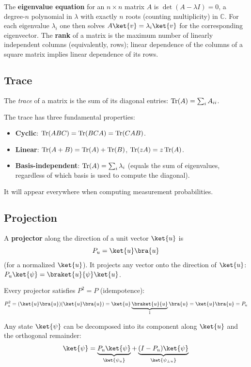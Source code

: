 \documentclass[oneside]{academica}
\begin{document}
The \textbf{eigenvalue equation} for an $n\times n$ matrix $A$ is $\det(A-\lambda I)=0$, a degree-$n$ polynomial in $\lambda$ with exactly $n$ roots (counting multiplicity) in $\mathbb{C}$.
For each eigenvalue $\lambda_i$ one then solves $A\ket{v}=\lambda_i\ket{v}$ for the corresponding eigenvector.
The \textbf{rank} of a matrix is the maximum number of linearly independent columns (equivalently, rows); linear dependence of the columns of a square matrix implies linear dependence of its rows.

\subsection{Trace}

\begin{definition*}[Trace]
  The \emph{trace} of a matrix is the sum of its diagonal entries:
  $\operatorname{Tr}(A)=\sum_i A_{ii}$.
\end{definition*}

The trace has three fundamental properties:
\begin{itemize}
  \item \textbf{Cyclic}: $\operatorname{Tr}(ABC)=\operatorname{Tr}(BCA)=\operatorname{Tr}(CAB)$.
  \item \textbf{Linear}: $\operatorname{Tr}(A+B)=\operatorname{Tr}(A)+\operatorname{Tr}(B)$, $\operatorname{Tr}(zA)=z\operatorname{Tr}(A)$.
  \item \textbf{Basis-independent}: $\operatorname{Tr}(A)=\sum_i\lambda_i$ (equals the sum of eigenvalues, regardless of which basis is used to compute the diagonal).
\end{itemize}
It will appear everywhere when computing measurement probabilities.

\subsection{Projection}

A \textbf{projector} along the direction of a unit vector $\ket{u}$ is
\begin{equation*}
  P_u = \ket{u}\bra{u}
\end{equation*}
(for a normalized $\ket{u}$).
It projects any vector onto the direction of $\ket{u}$:
$P_u\ket{\psi} = \braket{u}{\psi}\ket{u}$.

Every projector satisfies $P^2=P$ (idempotence):
\begin{equation*}
  P_u^2 = (\ket{u}\bra{u})(\ket{u}\bra{u}) = \ket{u}\underbrace{\braket{u}{u}}_{1}\bra{u} = \ket{u}\bra{u} = P_u
\end{equation*}

Any state $\ket{\psi}$ can be decomposed into its component along $\ket{u}$ and the orthogonal remainder:
\begin{equation*}
  \ket{\psi} = \underbrace{P_u\ket{\psi}}_{\ket{\psi_u}} + \underbrace{(I-P_u)\ket{\psi}}_{\ket{\psi_{\perp u}}}
\end{equation*}
\end{document}
